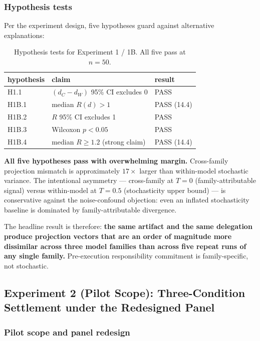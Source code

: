 \subsubsection{Hypothesis tests}
\label{sec:results:exp1b:hypotheses}

Per the experiment design, five hypotheses guard against alternative explanations:

\begin{table}[t]
\centering
\caption{Hypothesis tests for Experiment 1 / 1B. All five pass at $n = 50$.}
\label{tab:hypotheses}
\begin{tabular}{lll}
\toprule
\textbf{hypothesis} & \textbf{claim} & \textbf{result} \\
\midrule
H1.1   & $(d_C - d_W)$ 95\% CI excludes 0      & PASS \\
H1B.1  & median $R(d) > 1$                     & PASS (14.4) \\
H1B.2  & $R$ 95\% CI excludes 1                & PASS \\
H1B.3  & Wilcoxon $p < 0.05$                   & PASS \\
H1B.4  & median $R \geq 1.2$ (strong claim)    & PASS (14.4) \\
\bottomrule
\end{tabular}
\end{table}

\textbf{All five hypotheses pass with overwhelming margin.} Cross-family projection mismatch is approximately $17\times$ larger than within-model stochastic variance. The intentional asymmetry --- cross-family at $T = 0$ (family-attributable signal) versus within-model at $T = 0.5$ (stochasticity upper bound) --- is conservative against the noise-confound objection: even an inflated stochasticity baseline is dominated by family-attributable divergence.

The headline result is therefore: \textbf{the same artifact and the same delegation produce projection vectors that are an order of magnitude more dissimilar across three model families than across five repeat runs of any single family.} Pre-execution responsibility commitment is family-specific, not stochastic.


\subsection{Experiment 2 (Pilot Scope): Three-Condition Settlement under the Redesigned Panel}
\label{sec:results:exp2}

\subsubsection{Pilot scope and panel redesign}
\label{sec:results:exp2:scope}

